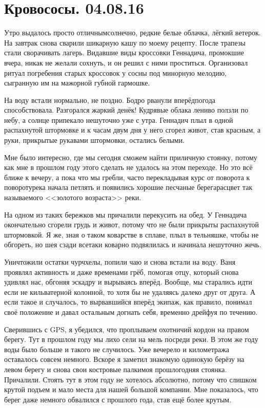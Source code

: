 \chapter{Кровососы. 04.08.16} 

Утро выдалось просто отличным\mdash  солнечно, редкие белые облачка, лёгкий ветерок. На завтрак снова сварили шикарную кашу по моему рецепту. После трапезы стали сворачивать лагерь. Видавшие виды кроссовки Геннадича, промокшие вчера, никак не желали сохнуть, и он решил с ними проститься. Организовал ритуал погребения старых кроссовок у сосны под минорную мелодию, сыгранную им на мажорной губной гармошке.

На воду встали нормально, не поздно.  Бодро рванули вперёд\mdash  погода способствовала. Разгорался жаркий денёк! Кудрявые облака лениво ползли по небу, а солнце припекало нешуточно уже с утра. Геннадич плыл в одной распахнутой штормовке и к часам двум дня у него сгорел живот, став красным, а руки, прикрытые рукавами штормовки, остались белыми. 

Мне было интересно, где мы сегодня сможем найти приличную стоянку, потому как мне в прошлом году этого сделать не удалось на этом переходе. Но это всё ближе к вечеру, а пока что мы гребли, часто перекладывая курс от поворота к повороту\mdash  река начала петлять и появились хорошие песчаные берега\mdash  расцвет так называемого <<золотого возраста>> реки.

На одном из таких бережков мы причалили перекусить на обед. У Геннадича окончательно сгорели грудь и живот, потому что не были прикрыты распахнутой штормовкой. Я же, зная о таком коварстве в сплаве, плыл в тельняшке, чтобы не обгореть, но шея сзади все\sdash таки коварно подвялилась и начинала нешуточно жечь.

Уничтожили остатки чурчхелы, попили чаю и снова встали на воду. Ваня проявлял активность и даже временами грёб, помогая отцу, который снова удивлял нас, обгоняя эскадру и вырываясь вперёд. Вообще, мы старались идти если не кильватерной колонной, то хотя бы не удаляясь далеко друг от друга. А если такое и случалось, то вырвавшийся вперёд экипаж, как правило, понимал своё положение и давал остальным догнать себя, временно дрейфуя по течению.

Сверившись с GPS, я убедился, что проплываем охотничий кордон на правом берегу. Тут в прошлом году мы лихо сели на мель посреди реки. В этом же году воды было больше и такого не случилось. Уже вечерело и километража оставалось совсем немного. Вскоре я заметил знакомую одинокую берёзу на левом берегу и снова свои костровые палки\mdash  моя прошлогодняя стоянка. Причалили. Стоять тут в этом году не хотелось абсолютно, потому что слишком крутой подъем и мало места для нашей большой компании. Мне показалось, что берег даже немного обвалился с прошлого года, став ещё более крутым.

